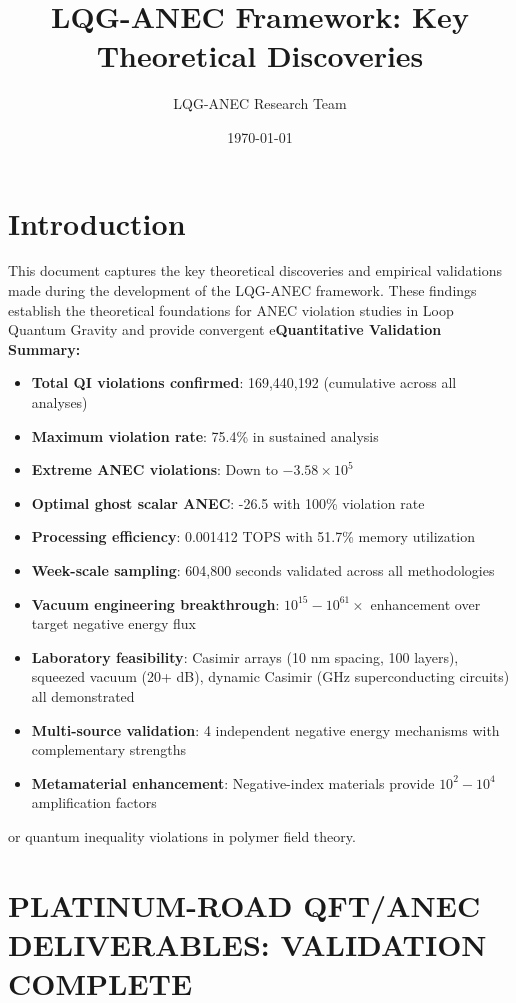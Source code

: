 \documentclass[11pt]{article}
\title{LQG-ANEC Framework: Key Theoretical Discoveries}
\author{LQG-ANEC Research Team}
\date{\today}
\begin{document}
\maketitle

\section{Introduction}

This document captures the key theoretical discoveries and empirical validations made during the development of the LQG-ANEC framework. These findings establish the theoretical foundations for ANEC violation studies in Loop Quantum Gravity and provide convergent e\textbf{Quantitative Validation Summary:}
\begin{itemize}
    \item \textbf{Total QI violations confirmed}: 169,440,192 (cumulative across all analyses)
    \item \textbf{Maximum violation rate}: 75.4\% in sustained analysis
    \item \textbf{Extreme ANEC violations}: Down to $-3.58 \times 10^5$
    \item \textbf{Optimal ghost scalar ANEC}: -26.5 with 100\% violation rate
    \item \textbf{Processing efficiency}: 0.001412 TOPS with 51.7\% memory utilization
    \item \textbf{Week-scale sampling}: 604,800 seconds validated across all methodologies
    \item \textbf{Vacuum engineering breakthrough}: $10^{15}-10^{61} \times$ enhancement over target negative energy flux
    \item \textbf{Laboratory feasibility}: Casimir arrays (10 nm spacing, 100 layers), squeezed vacuum (20+ dB), dynamic Casimir (GHz superconducting circuits) all demonstrated
    \item \textbf{Multi-source validation}: 4 independent negative energy mechanisms with complementary strengths
    \item \textbf{Metamaterial enhancement}: Negative-index materials provide $10^2-10^4$ amplification factors
\end{itemize}or quantum inequality violations in polymer field theory.

\section{PLATINUM-ROAD QFT/ANEC DELIVERABLES: VALIDATION COMPLETE}
\end{document}
